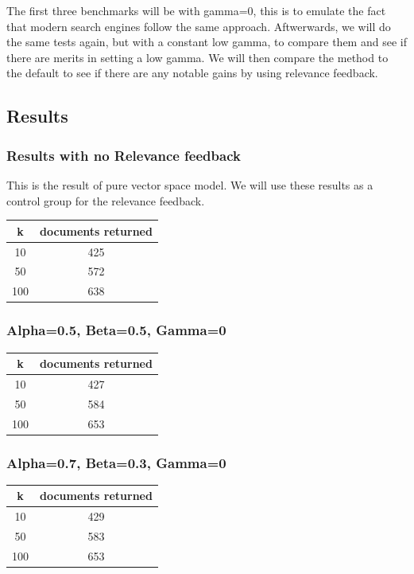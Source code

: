 \documentclass{article}
\begin{document}
The first three benchmarks will be with gamma=0, this is to emulate the fact that modern search engines follow the same approach. Aftwerwards, we will do the same tests again, but with a constant low gamma, to compare them and see if there are merits in setting a low gamma. We will then compare the method to the default to see if there are any notable gains by using relevance feedback. 

\subsection{Results}

\subsubsection{Results with no Relevance feedback}
This is the result of pure vector space model. We will use these results as a control group for the relevance feedback.

\begin{center}
\begin{tabular}{|c|c|} \hline
\textbf{k} & \textbf{documents returned} \\ \hline
10 & 425\\
50 & 572\\
100 & 638\\ \hline
\end{tabular}
\end{center}

\subsubsection{Alpha=0.5, Beta=0.5, Gamma=0}

\begin{center}
\begin{tabular}{|c|c|} \hline
\textbf{k} & \textbf{documents returned} \\ \hline
10 & 427 \\
50 & 584\\
100 & 653\\ \hline
\end{tabular}
\end{center}

\subsubsection{Alpha=0.7, Beta=0.3, Gamma=0}

\begin{center}
\begin{tabular}{|c|c|} \hline
\textbf{k} & \textbf{documents returned} \\ \hline
10 & 429\\
50 & 583\\
100 & 653\\ \hline
\end{tabular}
\end{center}
\end{document}
